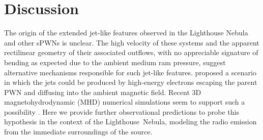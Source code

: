 \documentclass[letter]{aa}
\newcommand{\LNEB}{Lighthouse~Nebula}
\begin{document}
                                \section{Discussion}
                             \label{section:discussion}

The origin of the extended jet-like features observed in the Lighthouse Nebula and other sPWNs is unclear. 
%
The high velocity of these systems and the apparent rectilinear geometry of their associated outflows, with no appreciable signature of bending as expected due to the ambient medium ram pressure, suggest alternative mechanisms responsible for such jet-like features. \cite{Bandiera2008} proposed a scenario in which the jets could be produced by high-energy electrons escaping the parent PWN and diffusing into the ambient magnetic field. Recent 3D magnetohydrodynamic (MHD) numerical simulations seem to support such a possibility \citep{Barkov2019a, Bucciantini2020}. Here we provide further observational predictions to probe this hypothesis in the context of the \LNEB, modeling the radio emission from the immediate surroundings of the source. 
\end{document}
